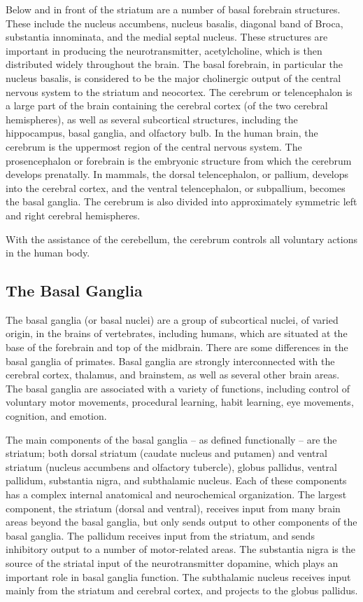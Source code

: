 Below and in front of the striatum are a number of basal forebrain structures. These include the nucleus accumbens, nucleus basalis, diagonal band of Broca, substantia innominata, and the medial septal nucleus. These structures are important in producing the neurotransmitter, acetylcholine, which is then distributed widely throughout the brain. The basal forebrain, in particular the nucleus basalis, is considered to be the major cholinergic output of the central nervous system to the striatum and neocortex.
The cerebrum or telencephalon is a large part of the brain containing the cerebral cortex (of the two cerebral hemispheres), as well as several subcortical structures, including the hippocampus, basal ganglia, and olfactory bulb. In the human brain, the cerebrum is the uppermost region of the central nervous system. The prosencephalon or forebrain is the embryonic structure from which the cerebrum develops prenatally. In mammals, the dorsal telencephalon, or pallium, develops into the cerebral cortex, and the ventral telencephalon, or subpallium, becomes the basal ganglia. The cerebrum is also divided into approximately symmetric left and right cerebral hemispheres.

With the assistance of the cerebellum, the cerebrum controls all voluntary actions in the human body.

\hypertarget{the-basal-ganglia}{%
\subsection{The Basal Ganglia}\label{the-basal-ganglia}}

The basal ganglia (or basal nuclei) are a group of subcortical nuclei, of varied origin, in the brains of vertebrates, including humans, which are situated at the base of the forebrain and top of the midbrain. There are some differences in the basal ganglia of primates. Basal ganglia are strongly interconnected with the cerebral cortex, thalamus, and brainstem, as well as several other brain areas. The basal ganglia are associated with a variety of functions, including control of voluntary motor movements, procedural learning, habit learning, eye movements, cognition, and emotion.

The main components of the basal ganglia -- as defined functionally -- are the striatum; both dorsal striatum (caudate nucleus and putamen) and ventral striatum (nucleus accumbens and olfactory tubercle), globus pallidus, ventral pallidum, substantia nigra, and subthalamic nucleus. Each of these components has a complex internal anatomical and neurochemical organization. The largest component, the striatum (dorsal and ventral), receives input from many brain areas beyond the basal ganglia, but only sends output to other components of the basal ganglia. The pallidum receives input from the striatum, and sends inhibitory output to a number of motor-related areas. The substantia nigra is the source of the striatal input of the neurotransmitter dopamine, which plays an important role in basal ganglia function. The subthalamic nucleus receives input mainly from the striatum and cerebral cortex, and projects to the globus pallidus.

